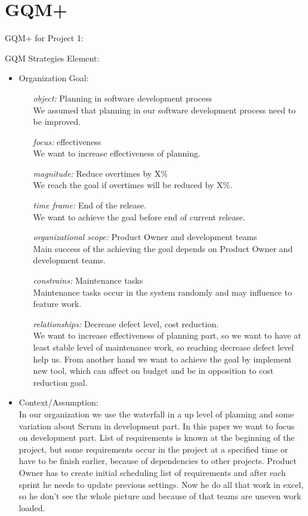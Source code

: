 \section{GQM+}

GQM+ for Project 1:

GQM Strategies Element:

\begin{itemize}
\item Organization Goal:
  \begin{itemize}
  \item[\textit{object:}] Planning in software development process \\
  We assumed that planning in our software development process need to be improved.
  \item[\textit{focus:}] effectiveness \\ We want to increase effectiveness of planning. 
  \item[\textit{magnitude:}] Reduce overtimes by X\% \\
  We reach the goal if overtimes will be reduced by X\%.
  \item[\textit{time frame:}] End of the release.\\
  We want to achieve the goal before end of current release.
  \item[\textit{organizational scope:}] Product Owner and development teams \\
  Main success of the achieving the goal depends on Product Owner and development teams.
  \item[\textit{constrains:}] Maintenance tasks \\
  Maintenance tasks occur in the system randomly and may influence to feature work.
  \item[\textit{relationships:}] Decrease defect level, cost reduction. \\
  We want to increase effectiveness of planning part, so we want to have at least stable level of maintenance work, so reaching decrease defect level help us. From another hand we want to achieve the goal by implement new tool, which can affect on budget and be in opposition to cost reduction goal.
  \end{itemize}
\item Context/Assumption: \\
In our organization we use the waterfall in a up level of planning and some variation about Scrum in development part. In this paper we want to focus on development part. List of requirements is known at the beginning of the project, but some requirements occur in the project at a specified time or have to be finish earlier, because of dependencies to other projects. Product Owner has to   create initial scheduling list of requirements and after each sprint he needs to update previous settings. Now he do all that work in excel, so he don't see the whole picture and because of that teams are uneven work loaded. 

\end{itemize}
